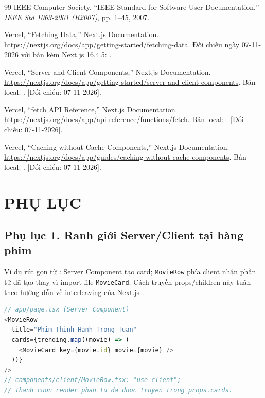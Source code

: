 \documentclass[12pt,a4paper]{extarticle}
\begin{document}
\begin{thebibliography}{99}
IEEE Computer Society, ``IEEE Standard for Software User Documentation,'' \textit{IEEE Std 1063-2001 (R2007)}, pp. 1--45, 2007.

Vercel, ``Fetching Data,'' Next.js Documentation. \url{https://nextjs.org/docs/app/getting-started/fetching-data}. Đối chiếu ngày 07-11-2026 với bản kèm Next.js 16.4.5: .

Vercel, ``Server and Client Components,'' Next.js Documentation. \url{https://nextjs.org/docs/app/getting-started/server-and-client-components}. Bản local: . [Đối chiếu: 07-11-2026].

Vercel, ``fetch API Reference,'' Next.js Documentation. \url{https://nextjs.org/docs/app/api-reference/functions/fetch}. Bản local: . [Đối chiếu: 07-11-2026].

Vercel, ``Caching without Cache Components,'' Next.js Documentation. \url{https://nextjs.org/docs/app/guides/caching-without-cache-components}. Bản local: . [Đối chiếu: 07-11-2026].
\end{thebibliography}

\newpage
\section*{PHỤ LỤC}
{}

\subsection*{Phụ lục 1. Ranh giới Server/Client tại hàng phim}
Ví dụ rút gọn từ : Server Component tạo card; \texttt{MovieRow} phía client nhận phần tử đã tạo thay vì import file \texttt{MovieCard}. Cách truyền props/children này tuân theo hướng dẫn về interleaving của Next.js \cite{nextjs_docs}.
\begin{lstlisting}[language=TypeScript]
// app/page.tsx (Server Component)
<MovieRow
  title="Phim Thinh Hanh Trong Tuan"
  cards={trending.map((movie) => (
    <MovieCard key={movie.id} movie={movie} />
  ))}
/>
// components/client/MovieRow.tsx: "use client";
// Thanh cuon render phan tu da duoc truyen trong props.cards.
\end{lstlisting}
\end{document}
